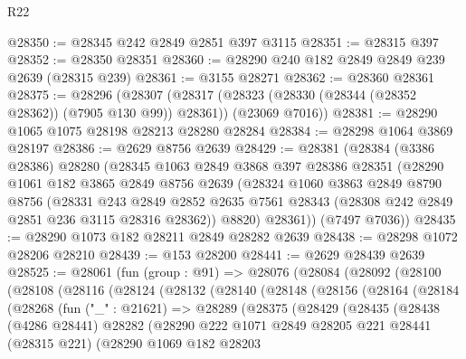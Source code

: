 \begin{lexlean}{R22}
\begin{coremodule}
@28350 := @28345 @242 @2849 @2851 @397 @3115
@28351 := @28315 @397
@28352 := @28350 @28351
@28360 := @28290 @240 @182 @2849 @2849 @239 @2639 (@28315 @239)
@28361 := @3155 @28271
@28362 := @28360 @28361
@28375 := @28296
    (@28307
      (@28317 (@28323 (@28330 (@28344 (@28352 @28362)) (@7905 @130 @99)) @28361))
      (@23069 @7016))
@28381 := @28290 @1065 @1075 @28198 @28213 @28280 @28284
@28384 := @28298 @1064 @3869 @28197
@28386 := @2629 @8756 @2639
@28429 := @28381
    (@28384
      (@3386 @28386)
      @28280
      (@28345
        @1063
        @2849
        @3868
        @397
        @28386
        @28351
        (@28290
          @1061
          @182
          @3865
          @2849
          @8756
          @2639
          (@28324
            @1060
            @3863
            @2849
            @8790
            @8756
            (@28331
              @243
              @2849
              @2852
              @2635
              @7561
              @28343
              (@28308 @242 @2849 @2851 @236 @3115 @28316 @28362))
            @8820)
          @28361))
      (@7497 @7036))
@28435 := @28290 @1073 @182 @28211 @2849 @28282 @2639
@28438 := @28298 @1072 @28206 @28210
@28439 := @153 @28200
@28441 := @2629 @28439 @2639
@28525 := @28061
    (fun (group : @91) =>
    @28076
      (@28084
        (@28092
          (@28100
            (@28108
              (@28116
                (@28124
                  (@28132
                    (@28140
                      (@28148
                        (@28156
                          (@28164
                            (@28184
                              (@28268
                                (fun ("_" : @21621) =>
                                @28289
                                  (@28375
                                    (@28429
                                      (@28435
                                        (@28438
                                          (@4286 @28441)
                                          @28282
                                          (@28290
                                            @222
                                            @1071
                                            @2849
                                            @28205
                                            @221
                                            @28441
                                            (@28315 @221)
                                            (@28290
                                              @1069
                                              @182
                                              @28203

\end{coremodule}
\end{lexlean}
